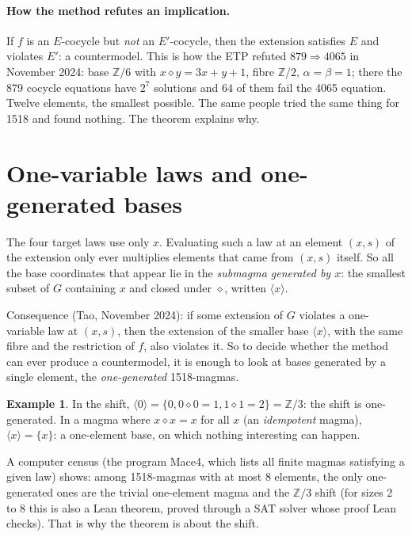 \documentclass[11pt]{article}
\theoremstyle{definition}\newtheorem{example}{Example}\newtheorem{exercise}{Exercise}
\theoremstyle{remark}\newtheorem*{remark}{Remark}
\newcommand{\op}{\diamond}
\newcommand{\Z}{\mathbb{Z}}
\begin{document}
\paragraph{How the method refutes an implication.} If $f$ is an $E$-cocycle but \emph{not} an $E'$-cocycle, then the extension satisfies $E$ and violates $E'$: a countermodel. This is how the ETP refuted $879\Rightarrow4065$ in November 2024: base $\Z/6$ with $x\op y = 3x+y+1$, fibre $\Z/2$, $\alpha=\beta=1$; there the 879 cocycle equations have $2^7$ solutions and $64$ of them fail the 4065 equation. Twelve elements, the smallest possible. The same people tried the same thing for 1518 and found nothing. The theorem explains why.

\section{One-variable laws and one-generated bases}\label{sec:onevar}

The four target laws use only $x$. Evaluating such a law at an element $(x,s)$ of the extension only ever multiplies elements that came from $(x,s)$ itself. So all the base coordinates that appear lie in the \emph{submagma generated by $x$}: the smallest subset of $G$ containing $x$ and closed under $\op$, written $\langle x\rangle$.

Consequence (Tao, November 2024): if some extension of $G$ violates a one-variable law at $(x,s)$, then the extension of the smaller base $\langle x\rangle$, with the same fibre and the restriction of $f$, also violates it. So to decide whether the method can ever produce a countermodel, it is enough to look at bases generated by a single element, the \emph{one-generated} 1518-magmas.

\begin{example}
In the shift, $\langle 0\rangle = \{0, 0\op0=1, 1\op 1 = 2\} = \Z/3$: the shift is one-generated. In a magma where $x\op x = x$ for all $x$ (an \emph{idempotent} magma), $\langle x\rangle=\{x\}$: a one-element base, on which nothing interesting can happen.
\end{example}

A computer census (the program Mace4, which lists all finite magmas satisfying a given law) shows: among 1518-magmas with at most 8 elements, the only one-generated ones are the trivial one-element magma and the $\Z/3$ shift (for sizes 2 to 8 this is also a Lean theorem, proved through a SAT solver whose proof Lean checks). That is why the theorem is about the shift.
\end{document}
